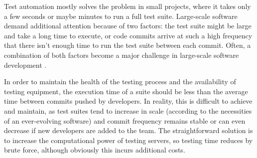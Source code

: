 Test automation mostly solves the problem in small projects, where it takes only a few seconds or maybe minutes to run a full test suite.
Large-scale software demand additional attention because of two factors: the test suite might be large and take a long time to execute, or code commits arrive at such a high frequency that there isn't enough time to run the test suite between each commit.
Often, a combination of both factors become a major challenge in large-scale software development \cite{memon_taming_2017}.

In order to maintain the health of the testing process and the availability of testing equipment, the execution time of a suite should be less than the average time between commits pushed by developers.
In reality, this is difficult to achieve and maintain, as test suites tend to increase in scale (according to the necessities of an ever-evolving software) and commit frequency remains stable or can even decrease if new developers are added to the team.
The straightforward solution is to increase the computational power of testing servers, so testing time reduces by brute force, although obviously this incurs additional costs.